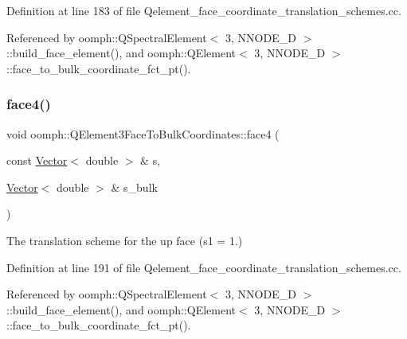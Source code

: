 Definition at line 183 of file Qelement\+\_\+face\+\_\+coordinate\+\_\+translation\+\_\+schemes.\+cc.



Referenced by oomph\+::\+Q\+Spectral\+Element$<$ 3, N\+N\+O\+D\+E\+\_\+D $>$\+::build\+\_\+face\+\_\+element(), and oomph\+::\+Q\+Element$<$ 3, N\+N\+O\+D\+E\+\_\+D $>$\+::face\+\_\+to\+\_\+bulk\+\_\+coordinate\+\_\+fct\+\_\+pt().

\mbox{\label{namespaceoomph_1_1QElement3FaceToBulkCoordinates_a18050dd9aefd4134861982ea39a9c5b5}} 
\subsubsection{\texorpdfstring{face4()}{face4()}}
{\footnotesize\ttfamily void oomph\+::\+Q\+Element3\+Face\+To\+Bulk\+Coordinates\+::face4 (\begin{DoxyParamCaption}\item[{const \hyperlink{classoomph_1_1Vector}{Vector}$<$ double $>$ \&}]{s,  }\item[{\hyperlink{classoomph_1_1Vector}{Vector}$<$ double $>$ \&}]{s\+\_\+bulk }\end{DoxyParamCaption})}



The translation scheme for the up face (s1 = 1.) 



Definition at line 191 of file Qelement\+\_\+face\+\_\+coordinate\+\_\+translation\+\_\+schemes.\+cc.



Referenced by oomph\+::\+Q\+Spectral\+Element$<$ 3, N\+N\+O\+D\+E\+\_\+D $>$\+::build\+\_\+face\+\_\+element(), and oomph\+::\+Q\+Element$<$ 3, N\+N\+O\+D\+E\+\_\+D $>$\+::face\+\_\+to\+\_\+bulk\+\_\+coordinate\+\_\+fct\+\_\+pt().

\mbox{\label{namespaceoomph_1_1QElement3FaceToBulkCoordinates_a94e7b485fee86028127004c7913831ab}} 
